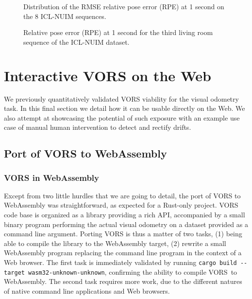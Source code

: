 \begin{figure}[ht]
	\centering
	
	\caption{Distribution of the RMSE relative pose error (RPE) at 1 second
	on the 8 ICL-NUIM sequences.}%
	\label{fig:rpe_rmse_icl}
\end{figure}

\begin{figure}[ht]
	\centering
	
	\caption{Relative pose error (RPE) at 1 second for the third
	living room sequence of the ICL-NUIM dataset.}%
	\label{fig:rpe_icl3}
\end{figure}

\clearpage
\section{Interactive VORS on the Web}%
\label{sec:interactive-vors}

We previously quantitatively validated VORS viability for the visual odometry task.
In this final section we detail how it can be usable directly on the Web.
We also attempt at showcasing the potential of such exposure with
an example use case of manual human intervention to detect and rectify drifts.

\subsection{Port of VORS to WebAssembly}%
\label{sub:vors-port-wasm}

\subsubsection{VORS in WebAssembly}%

Except from two little hurdles that we are going to detail,
the port of VORS to WebAssembly was straightforward,
as expected for a Rust-only project.
VORS code base is organized as a library providing a rich API,
accompanied by a small binary program performing the actual visual odometry
on a dataset provided as a command line argument.
Porting VORS is thus a matter of two tasks,
(1) being able to compile the library to the WebAssembly target,
(2) rewrite a small WebAssembly program replacing the command line program
in the context of a Web browser.
The first task is immediately validated by running
\verb|cargo build --target wasm32-unknown-unknown|,
confirming the ability to compile VORS to WebAssembly.
The second task requires more work,
due to the different natures of native command line applications and Web browsers.

